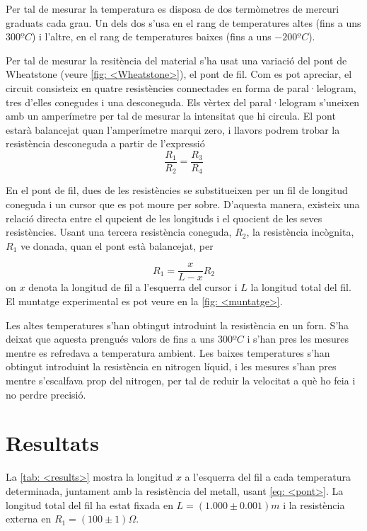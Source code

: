 Per tal de mesurar la temperatura es disposa de dos termòmetres de mercuri graduats cada grau. Un dels dos s'usa en el rang de temperatures altes (fins a uns $300\si{ºC}$) i l'altre, en el rang de temperatures baixes (fins a uns $-200 \si{ºC}$).

Per tal de mesurar la resitència del material s'ha usat una variació del pont de Wheatstone (veure \ref{fig: <Wheatstone>}), el pont de fil. Com es pot apreciar, el circuit consisteix en quatre resistències connectades en forma de paral·lelogram, tres d'elles conegudes i una desconeguda. Els vèrtex del paral·lelogram s'uneixen amb un amperímetre per tal de mesurar la intensitat que hi circula. El pont estarà balancejat quan l'amperímetre marqui zero, i llavors podrem trobar la resistència desconeguda a partir de l'expressió
\begin{equation}
\frac{R_1}{R_2}=\frac{R_3}{R_4}
\end{equation} 

En el pont de fil, dues de les resistències se substitueixen per un fil de longitud coneguda i un cursor que es pot moure per sobre. D'aquesta manera, existeix una relació directa entre el qupcient de les longituds i el quocient de les seves resistències. Usant una tercera resistència coneguda, $R_2$, la resistència incògnita, $R_1$ ve donada, quan el pont està balancejat, per

\begin{equation}\label{eq: <pont>}
R_1=\frac{x}{L-x}R_2
\end{equation}
on $x$ denota la longitud de fil a l'esquerra del cursor i $L$ la longitud total del fil. El muntatge experimental es pot veure en la \ref{fig: <muntatge>}. 

Les altes temperatures s'han obtingut introduint la resistència en un forn. S'ha deixat que aquesta prengués valors de fins a uns $300\si{ºC}$ i s'han pres les mesures mentre es refredava a temperatura ambient. Les baixes temperatures s'han obtingut introduint la resistència en nitrogen líquid, i les mesures s'han pres mentre s'escalfava prop del nitrogen, per tal de reduir la velocitat a què ho feia i no perdre precisió.


\section{Resultats}

La \ref{tab: <results>} mostra la longitud $x$ a l'esquerra del fil a cada temperatura determinada, juntament amb la resistència del metall, usant \ref{eq: <pont>}. La longitud total del fil ha estat fixada en $L=(1.000\pm0.001)\si{m}$ i la resistència externa en $R_1=(100\pm1)\si{\Omega}$.

